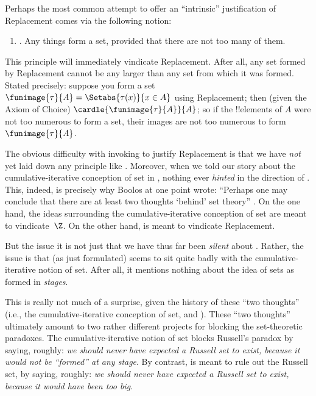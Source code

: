 \documentclass[../../../include/open-logic-section]{subfiles}
\begin{document}

Perhaps the most common attempt to offer an ``intrinsic'' justification of
Replacement comes via the following notion:
\begin{enumerate}
	\item[] \limofsize. Any things form a set, provided that there are
	not too many of them.
\end{enumerate}
This principle will immediately vindicate Replacement. After all, any
set formed by Replacement cannot be any larger than any set from which
it was formed. Stated precisely: suppose you form a set
$\funimage{\tau}{A} = \Setabs{\tau(x)}{x \in A}$ using Replacement;
then (given the Axiom of Choice) $\cardle{\funimage{\tau}{A}}{A}$; so if the !!{element}s of $A$
were not too numerous to form a set, their images are not too numerous
to form $\funimage{\tau}{A}$. 

The obvious difficulty with invoking \limofsize{} to justify
Replacement is that we have \emph{not} yet laid down any principle
like \limofsize. Moreover, when we told our story about the
cumulative-iterative conception of set in
, nothing ever \emph{hinted}
in the direction of \limofsize. This, indeed, is precisely why Boolos
at one point wrote: ``Perhaps one may conclude that there are at least
two thoughts `behind' set theory'' \citeyearpar[p.~19]{Boolos1989}. On
the one hand, the ideas surrounding the cumulative-iterative
conception of set are meant to vindicate~$\Z$. On the other hand,
\limofsize{} is meant to vindicate Replacement. 

But the issue it is not just that we have thus far been \emph{silent}
about \limofsize. Rather, the issue is that \limofsize{} (as just
formulated) seems to sit quite badly with the cumulative-iterative
notion of set. After all, it mentions nothing about the idea of sets
as formed in \emph{stages}.

This is really not much of a surprise, given the history of these
``two thoughts'' (i.e., the cumulative-iterative conception of set,
and \limofsize). These ``two thoughts'' ultimately amount to two
rather  different projects for blocking the set-theoretic paradoxes.
The cumulative-iterative notion of set blocks Russell's paradox by
saying, roughly: \emph{we should never have expected a Russell set to
exist, because it would not be ``formed'' at any stage}. By contrast,
\limofsize{} is meant to rule out the Russell set, by saying, roughly:
\emph{we should never have expected a Russell set to exist, because it
would have been too big}. 
\end{document}

